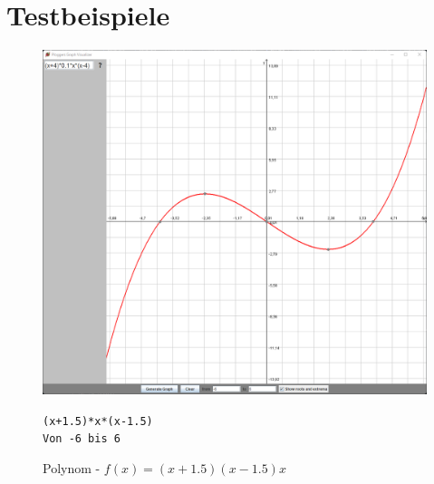 \documentclass[12pt]{article}
\begin{document}
	\section*{Testbeispiele}

	\begin{figure}[!ht]
		\begin{center}
			\includegraphics[scale=0.5]{images/sample1.png}
		\end{center}
		\caption{Polynom - $f(x) = (x+1.5)(x-1.5)x$}
		
		\begin{center}
			\texttt{(x+1.5)*x*(x-1.5)} \\
			\texttt{Von -6 bis 6}
		\end{center}
	\end{figure}
\end{document}
